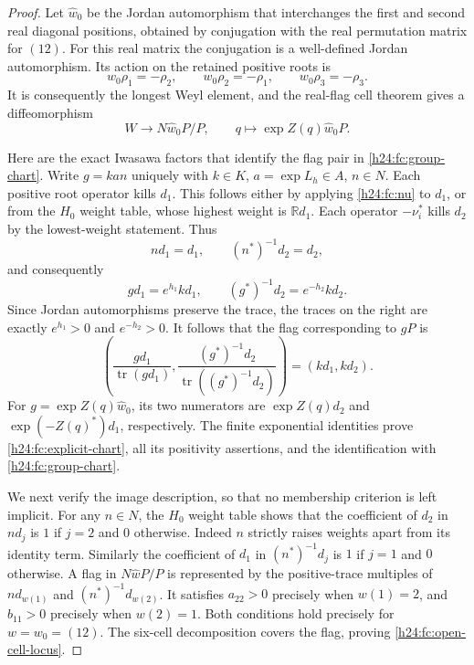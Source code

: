 \begin{proof}
Let $\widehat w_0$ be the Jordan automorphism that interchanges
the first and second real diagonal positions, obtained by conjugation
with the real permutation matrix for $(12)$. For this real matrix
the conjugation is a well-defined Jordan automorphism. Its action on
the retained positive roots is
\[
 w_0\rho_1=-\rho_2,\qquad
 w_0\rho_2=-\rho_1,\qquad
 w_0\rho_3=-\rho_3.
\]
It is consequently the longest Weyl element, and the real-flag
cell theorem gives a diffeomorphism
\begin{equation}
 W\longrightarrow N\widehat w_0P/P,\qquad
 q\longmapsto\exp Z(q)\widehat w_0P.
 \label{h24:fc:group-chart}
\end{equation}

Here are the exact Iwasawa factors that identify the flag pair in
\eqref{h24:fc:group-chart}. Write $g=kan$ uniquely with
$k\in K$, $a=\exp L_h\in A$, $n\in N$. Each positive root
operator kills $d_1$. This follows either by applying
\eqref{h24:fc:nu} to $d_1$, or from the $H_0$ weight table,
whose highest weight is $\mathbb R d_1$. Each operator
$-\nu_i^*$ kills $d_2$ by the lowest-weight statement. Thus
\[
 nd_1=d_1,\qquad (n^*)^{-1}d_2=d_2,
\]
and consequently
\begin{equation}
 gd_1=e^{h_1}kd_1,\qquad
 (g^*)^{-1}d_2=e^{-h_2}kd_2.
 \label{h24:fc:iwasawa-flag-factors}
\end{equation}
Since Jordan automorphisms preserve the trace,
the traces on the right are exactly $e^{h_1}>0$ and $e^{-h_2}>0$.
It follows that the flag corresponding to $gP$ is
\[
 \left(\frac{gd_1}{\operatorname{tr}(gd_1)},
       \frac{(g^*)^{-1}d_2}{\operatorname{tr}((g^*)^{-1}d_2)}\right)
       =(kd_1,kd_2).
\]
For $g=\exp Z(q)\widehat w_0$, its two numerators are
$\exp Z(q)d_2$ and $\exp(-Z(q)^*)d_1$, respectively.
The finite exponential identities prove
\eqref{h24:fc:explicit-chart}, all its positivity assertions,
and the identification with \eqref{h24:fc:group-chart}.

We next verify the image description, so that no membership criterion
is left implicit. For any $n\in N$, the $H_0$ weight table shows
that the coefficient of $d_2$ in $nd_j$ is $1$ if $j=2$ and $0$
otherwise. Indeed $n$ strictly raises weights apart from its identity
term. Similarly the coefficient of $d_1$ in $(n^*)^{-1}d_j$ is
$1$ if $j=1$ and $0$ otherwise. A flag in $N\widehat wP/P$ is
represented by the positive-trace multiples of
$nd_{w(1)}$ and $(n^*)^{-1}d_{w(2)}$. It satisfies
$a_{22}>0$ precisely when $w(1)=2$, and $b_{11}>0$ precisely
when $w(2)=1$. Both conditions hold precisely for $w=w_0=(12)$.
The six-cell decomposition covers the flag, proving
\eqref{h24:fc:open-cell-locus}.


\end{proof}
